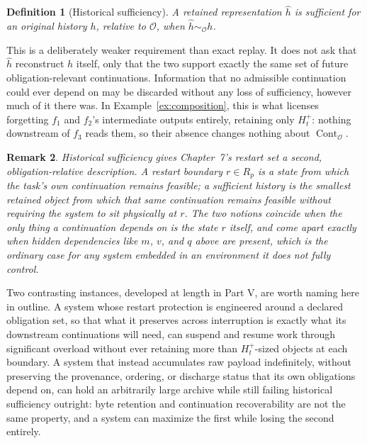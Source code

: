 \documentclass[11pt]{report}
\newtheorem{definition}{Definition}[chapter]
\newtheorem{remark}[definition]{Remark}
\begin{document}
\begin{definition}[Historical sufficiency]
A retained representation $\widehat h$ is sufficient for an original history $h$, relative to $\mathcal O$, when $\widehat h \sim_{\mathcal O} h$.
\end{definition}

This is a deliberately weaker requirement than exact replay. It does not ask that $\widehat h$ reconstruct $h$ itself, only that the two support exactly the same set of future obligation-relevant continuations. Information that no admissible continuation could ever depend on may be discarded without any loss of sufficiency, however much of it there was. In Example~\ref{ex:composition}, this is what licenses forgetting $f_1$ and $f_2$'s intermediate outputs entirely, retaining only $H_t^+$: nothing downstream of $f_3$ reads them, so their absence changes nothing about $\operatorname{Cont}_{\mathcal O}$.

\begin{remark}
Historical sufficiency gives Chapter~7's restart set a second, obligation-relative description. A restart boundary $r \in R_p$ is a state from which the task's own continuation remains feasible; a sufficient history is the smallest retained object from which that same continuation remains feasible without requiring the system to sit physically at $r$. The two notions coincide when the only thing a continuation depends on is the state $r$ itself, and come apart exactly when hidden dependencies like $m$, $v$, and $q$ above are present, which is the ordinary case for any system embedded in an environment it does not fully control.
\end{remark}

Two contrasting instances, developed at length in Part V, are worth naming here in outline. A system whose restart protection is engineered around a declared obligation set, so that what it preserves across interruption is exactly what its downstream continuations will need, can suspend and resume work through significant overload without ever retaining more than $H_t^+$-sized objects at each boundary. A system that instead accumulates raw payload indefinitely, without preserving the provenance, ordering, or discharge status that its own obligations depend on, can hold an arbitrarily large archive while still failing historical sufficiency outright: byte retention and continuation recoverability are not the same property, and a system can maximize the first while losing the second entirely.
\end{document}
